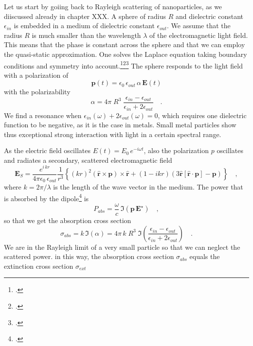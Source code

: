 Let us start by goiing back to  Rayleigh scattering of nanoparticles, as we diiscussed already in chapter XXX. A sphere of radius $R$ and dielectric constant $\epsilon_{in}$ is embedded in a medium of dielectric constant $\epsilon_{out}$. We assume that the radius $R$ is much smaller than the wavelength $\lambda$ of the electromagnetic light field. This means that the phase is constant across the sphere and that we can employ the quasi-static approximation. One solves the Laplace equation taking  boundary conditions and symmetry into account.\footcite{Jackson-ED}\footcite[excercise 2.4.2]{Nolting-ED}\footcite[chapter 5.2]{BH-book}
The sphere responds to the light field with a polarization of
\begin{equation}
 \mathbf{p}(t) = \epsilon_0 \,  \epsilon_{out} \, \alpha \, \mathbf{E}(t)
\end{equation}
with the polarizability
\begin{equation}
 \alpha = 4 \pi  \; R^3 \; \frac{\epsilon_{in} - \epsilon_{out}}{\epsilon_{in} + 2 \epsilon_{out}} \quad .
\end{equation}
We find a resonance when $\epsilon_{in}(\omega) + 2 \epsilon_{out}(\omega) = 0$, which requires one dielectric function to be negative, as it is the case in metals. Small metal particles show thus exceptional strong interaction with light in a certain spectral range.




As the electric field oscillates $E(t) = E_0 \, e^{-i \omega t}$, also the polarization $p$ oscillates and radiates a secondary, scattered electromagnetic field 
\begin{equation}
  \mathbf{E}_S = \frac{ e^{i \, k  r} }{4\pi\epsilon_0 \, \epsilon_{out}}  \frac{1}{r^3}\left\{
      (k r )^2 \left( \hat{\mathbf{r}} \times \mathbf{p} \right) \times \hat{\mathbf{r}} +
      \left( 1 -  i k r \right)
        \left( 3\hat{\mathbf{r}} \left[\hat{\mathbf{r}} \cdot \mathbf{p}\right] - \mathbf{p} \right)
    \right\} \quad ,
\end{equation}
where $k = 2 \pi / \lambda$ is the length of the wave vector in the medium. The power that is absorbed by the dipole\footcite[Chapter 8]{Novotny-Hecht2012} is
\begin{equation}
 P_{abs} = \frac{\omega}{c} \, \Im \left( \mathbf{p} \, \mathbf{E}^\star \right)  \quad ,
\end{equation}
so that we get the absorption cross section
\begin{equation}
 \sigma_{abs} = k \, \Im ( \alpha ) =  4 \pi \, k \; R^3 \; \Im \left( \frac{\epsilon_{in} - \epsilon_{out}}{\epsilon_{in} + 2 \epsilon_{out}} \right) \quad .
 \label{eq:hybrid_sigma_abs}
\end{equation}
We are in the Rayleigh  limit of a very small particle so that we can neglect the scattered power. in this way, the absorption cross section
$ \sigma_{abs} $ equals the extinction  cross section $ \sigma_{ext} $ 


